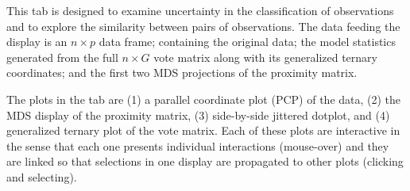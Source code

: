 \documentclass[smallextended,natbib]{svjour3}\usepackage[]{graphicx}\usepackage[]{xcolor}
\begin{document}
This tab is designed to examine uncertainty in the classification of observations and to explore the similarity between pairs of observations. The data feeding the display is an $n\times p$ data frame; containing the original data; the model statistics generated from the full $n\times G$ vote matrix along with its generalized ternary coordinates; and the first two MDS projections of the proximity matrix.

The plots in the tab are (1) a parallel coordinate plot (PCP) of the data, (2) the MDS display of the proximity matrix, (3) side-by-side jittered dotplot, and (4) generalized ternary plot of the vote matrix. Each of these plots are interactive in the sense that each one presents individual interactions (mouse-over) and they are linked so that selections in one display are propagated to other plots (clicking and selecting).
\end{document}
